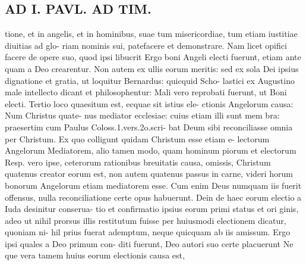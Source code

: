 \documentclass{article}
\begin{document}
\begin{pages}
\section*{AD I. PAVL. AD TIM. }
\marginpar{[ p.334 ]}tione, et in angelis, et in hominibus, suae tum misericordiae, tum etiam iustitiae diuitias ad glo- riam nominis sui, patefacere et demonstrare. Nam licet opifici facere de opere suo, quod ipsi libucrit Ergo boni Angeli electi fuerunt, etiam ante quam a Deo crearentur. Non autem ex ullis eorum meritis: sed ex sola Dei ipsius dignatione et gratia, ut loquitur Bernardus: quicquid Scho- lastici ex Augustino male intellecto dicant et philosophentur: Mali vero reprobati fuerunt, ut Boni electi. Tertio loco quaesitum est, ecquae sit istius ele- ctionis Angelorum causa: Num Christus quate- nus mediator ecclesiae: cuius etiam illi sunt mem bra: praesertim cum Paulus Coloss.1.vers.2o.scri- bat Deum sibi reconciliasse omnia per Christum. Ex quo colligunt quidam Christum esse etiam e- lectorum Angelorum Mediatorem, alio tamen modo, quam hominum piorum et electorum Resp. vero ipse, ceterorum rationibus breuitatis causa, omissis, Christum quatenus creator eorum est, non autem quatenus passus in carne, videri horum bonorum Angelorum etiam mediatorem esse. Cum enim Deus numquam iis fuerit offensus, nulla reconciliatione certe opus habuerunt. Dein de haec eorum electio a Iuda desinitur conserua- tio et confirmatio ipsius eorum primi status et ori ginis, adeo ut nihil prorsus illis restitutum fuisse per huiusmodi electionem dicatur, quoniam ni- hil prius fuerat ademptum, neque quicquam ab iis amissum. Ergo ipsi quales a Deo primum con- diti fuerunt, Deo autori suo certe placuerunt Ne que vera tamem huius eorum electionis causa est, 

\end{pages}
\end{document}
